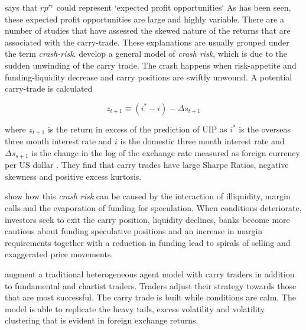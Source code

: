 \documentclass[12pt, a4paper, oneside]{article}\usepackage[]{graphicx}\usepackage[]{color}
\begin{document}
\citet[p.148]{Engel1996} says that $rp^{re}$ could represent `expected profit opportunities` As has been seen, these expected profit opportunities are large and highly variable.  There are a number of studies that have assessed the skewed nature of the returns that are associated with the carry-trade.  These explanations are usually grouped under the term \emph{crash-risk}.  \citet{BrunnermeierCarry} develop a general model of \emph{crash risk}, which is due to the sudden unwinding of the carry trade.  The crash happens when risk-appetite and funding-liquidity decrease and carry positions are swiftly unwound. A potential carry-trade is calculated 

\begin{equation}\label{eqref:carry}
z_{t+1} \equiv (i^* - i) -\Delta s_{t+1}
\end{equation}

where $z_{t+1}$ is the return in excess of the prediction of UIP as $i^*$ is the overseas three  month interest rate and $i$ is the domestic three month interest rate and $\Delta s_{s+1}$ is the change in the log of the exchange rate measured as foreign currency per US dollar \citet[pp. 8-9]{BrunnermeierCarry}.   They find that carry trades have large Sharpe Ratios, negative skewness and positive excess kurtosis.  

\citet{BrunnermeierLiquidity} show how this \emph{crash risk} can be caused by the interaction of illiquidity, margin calls and the evaporation of funding for speculation.  When conditions deteriorate, investors seek to exit the carry position, liquidity declines, banks become more cautious about funding speculative positions and an increase in margin requirements together with a reduction in funding lead to spirals of selling and exaggerated price movements.

 \citet{SpronkEER} augment a traditional heterogeneous agent model with carry traders in addition to fundamental and chartist traders.  Traders adjust their strategy towards those that are most successful. The carry trade is built while conditions are calm.    The model is able to replicate the heavy tails, excess volatility and volatility clustering that is evident in foreign exchange returns.  
\end{document}
